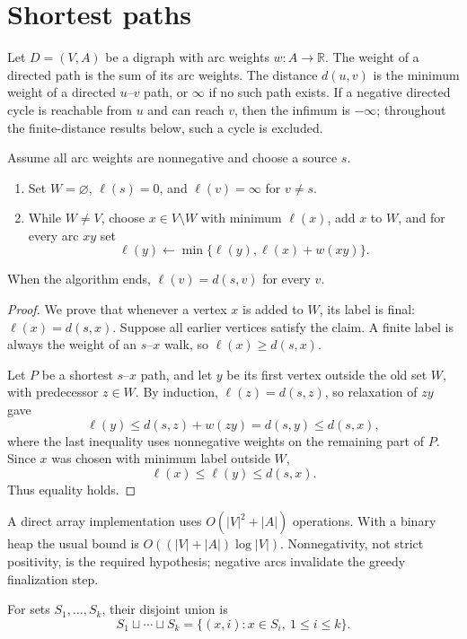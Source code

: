 \section{Shortest paths}

\begin{notedefinition}
Let $D=(V,A)$ be a digraph with arc weights $w:A\to\mathbb R$.  The weight of a directed path is the sum of its arc weights.  The distance $d(u,v)$ is the minimum weight of a directed $u$--$v$ path, or $\infty$ if no such path exists.  If a negative directed cycle is reachable from $u$ and can reach $v$, then the infimum is $-\infty$; throughout the finite-distance results below, such a cycle is excluded.
\end{notedefinition}

\begin{notealgorithm}[Dijkstra]
Assume all arc weights are nonnegative and choose a source $s$.
\begin{enumerate}
  \item Set $W=\varnothing$, $\ell(s)=0$, and $\ell(v)=\infty$ for $v\ne s$.
  \item While $W\ne V$, choose $x\in V\setminus W$ with minimum $\ell(x)$, add $x$ to $W$, and for every arc $xy$ set
  \[
    \ell(y)\leftarrow\min\{\ell(y),\ell(x)+w(xy)\}.
  \]
\end{enumerate}
When the algorithm ends, $\ell(v)=d(s,v)$ for every $v$.
\end{notealgorithm}
\begin{proof}
We prove that whenever a vertex $x$ is added to $W$, its label is final: $\ell(x)=d(s,x)$.  Suppose all earlier vertices satisfy the claim.  A finite label is always the weight of an $s$--$x$ walk, so $\ell(x)\ge d(s,x)$.

Let $P$ be a shortest $s$--$x$ path, and let $y$ be its first vertex outside the old set $W$, with predecessor $z\in W$.  By induction, $\ell(z)=d(s,z)$, so relaxation of $zy$ gave
\[
  \ell(y)\le d(s,z)+w(zy)=d(s,y)\le d(s,x),
\]
where the last inequality uses nonnegative weights on the remaining part of $P$.  Since $x$ was chosen with minimum label outside $W$,
\[
  \ell(x)\le\ell(y)\le d(s,x).
\]
Thus equality holds.
\end{proof}

\begin{noteremark}
A direct array implementation uses $O(|V|^2+|A|)$ operations.  With a binary heap the usual bound is $O((|V|+|A|)\log|V|)$.  Nonnegativity, not strict positivity, is the required hypothesis; negative arcs invalidate the greedy finalization step.
\end{noteremark}
\begin{notedefinition}
For sets $S_1,\ldots,S_k$, their disjoint union is
\[
  S_1\sqcup\cdots\sqcup S_k
  =\{(x,i):x\in S_i,\ 1\le i\le k\}.
\]
\end{notedefinition}

